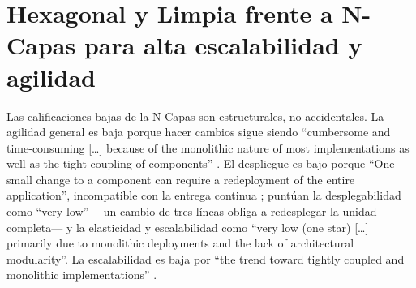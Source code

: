 \section{Hexagonal y Limpia frente a N-Capas para alta escalabilidad y agilidad}
\label{sec:p6-hexagonal-clean}

Las calificaciones bajas de la N-Capas son estructurales, no accidentales. La agilidad general
es baja porque hacer cambios sigue siendo “cumbersome and time-consuming [\ldots] because of the
monolithic nature of most implementations as well as the tight coupling of components”
\parencite[8]{richards2015}. El despliegue es bajo porque “One small change to a component can
require a redeployment of the entire application”, incompatible con la entrega continua
\parencite[8]{richards2015}; \textcite[cap.~10]{richardsford2020} puntúan la desplegabilidad
como “very low” —un cambio de tres líneas obliga a redesplegar la unidad completa— y la
elasticidad y escalabilidad como “very low (one star) [\ldots] primarily due to monolithic
deployments and the lack of architectural modularity”. La escalabilidad es baja por “the trend
toward tightly coupled and monolithic implementations” \parencite[9]{richards2015}.

